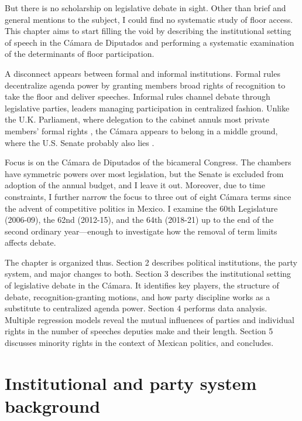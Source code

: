 \documentclass[letter,12pt]{article}
\begin{document}
But there is no scholarship on legislative debate in sight. Other than brief and general mentions to the subject, I could find no systematic study of floor access. This chapter aims to start filling the void by describing the institutional setting of speech in the Cámara de Diputados and performing a systematic examination of the determinants of floor participation.

A disconnect appears between formal and informal institutions. Formal rules decentralize agenda power by granting members broad rights of recognition to take the floor and deliver speeches. Informal rules channel debate through legislative parties, leaders managing participation in centralized fashion. Unlike the U.K. Parliament, where delegation to the cabinet annuls most private members' formal rights \citep{cox.1987}, the Cámara appears to belong in a middle ground, where the U.S. Senate probably also lies \citep{denhartog.monroe.SenateBook.2011}.

Focus is on the Cámara de Diputados of the bicameral Congress. The chambers have symmetric powers over most legislation, but the Senate is excluded from adoption of the annual budget, and I leave it out. Moreover, due to time constraints, I further narrow the focus to three out of eight Cámara terms since the advent of competitive politics in Mexico. I examine the 60th Legislature (2006-09), the 62nd (2012-15), and the 64th (2018-21) up to the end of the second ordinary year---enough to investigate how the removal of term limits affects debate.

The chapter is organized thus. Section 2 describes political institutions, the party system, and major changes to both. Section 3 describes the institutional setting of legislative debate in the Cámara. It identifies key players, the structure of debate, recognition-granting motions, and how party discipline works as a substitute to centralized agenda power. Section 4 performs data analysis. Multiple regression models reveal the mutual influences of parties and individual rights in the number of speeches deputies make and their length. Section 5 discusses minority rights in the context of Mexican politics, and concludes. 

\section{Institutional and party system background} %

\end{document}
